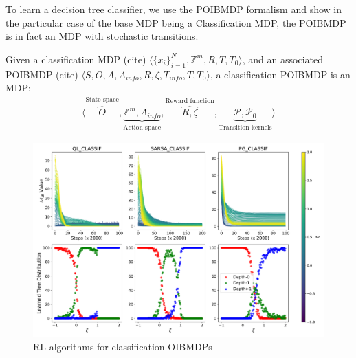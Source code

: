 To learn a decision tree classifier, we use the POIBMDP formalism and show in the particular case of the base MDP being a Classification MDP, the POIBMDP is in fact an MDP with stochastic transitions. 

\begin{definition}
    Given a classification MDP (cite) $\langle {\{x_i\}}_{i=1}^N, \mathbb{Z}^m, R, T, T_0 \rangle$, and an associated POIBMDP (cite) $\langle S, O, A, A_{info}, R, \zeta, T_{info}, T, T_0\rangle$, a classification POIBMDP is an MDP:
    \begin{align*}
        \langle \overbrace{O}^{\text{State space}}, \underbrace{\mathbb{Z}^m, A_{info}}_{\text{Action space}}, \overbrace{R, \zeta}^{\text{Reward function}}, \underbrace{\mathcal{P}, \mathcal{P}_0}_{\text{Transition kernels}} \rangle
    \end{align*}  
\end{definition}
\begin{figure}
    \centering
    \includegraphics[width=1\textwidth]{images/images_part1/quick_plot_combined_classif.pdf}
    \caption{RL algorithms for classification OIBMDPs}\label{fig:rl-classif-poibmdp}
\end{figure}
